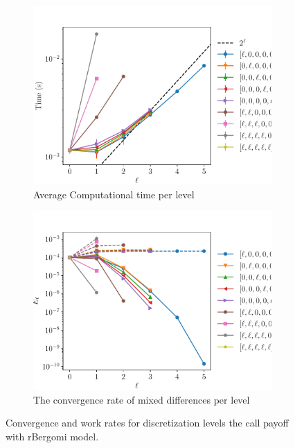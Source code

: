 \documentclass[11pt]{article}
\begin{document}
\begin{figure}[!h]
	\centering
	\begin{subfigure}{.5\textwidth}
		\centering
		\includegraphics[width=0.95\linewidth]{./figures/rbergomi_16_steps_K_1_2/level_work.pdf}
		\caption{Average Computational time per level}
		\label{fig:misc_rbergomi_16_steps_K_1_2_sub3}
	\end{subfigure}%
	\begin{subfigure}{.5\textwidth}
		\centering
		\includegraphics[width=0.95\linewidth]{./figures/rbergomi_16_steps_K_1_2/levels_error_rate.pdf}
		\caption{  The convergence rate of mixed differences per level}
		\label{fig:misc_rbergomi_16_steps_K_1_2_sub4}
	\end{subfigure}%
	\caption{Convergence and work rates for discretization levels  the call payoff with rBergomi model.}
	\label{fig:misc_rbergomi_16_steps_K_1_2_2}
\end{figure}
\end{document}
